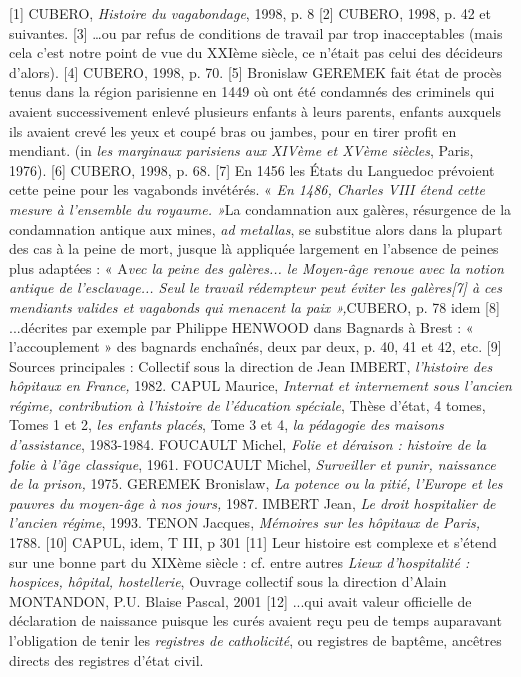 [1] CUBERO, \emph{Histoire du vagabondage}, 1998, p. 8
[2] CUBERO, 1998, p. 42 et suivantes.
[3] …ou par refus de conditions de travail par trop inacceptables (mais cela c'est notre point de vue du XXIème siècle, ce n'était pas celui des décideurs d'alors).
[4] CUBERO, 1998, p. 70.
[5] Bronislaw GEREMEK fait état de procès tenus dans la région parisienne en 1449 où ont été condamnés des criminels qui avaient successivement enlevé plusieurs enfants à leurs parents, enfants auxquels ils avaient crevé les yeux et coupé bras ou jambes, pour en tirer profit en mendiant. (in\emph{ les marginaux parisiens aux XIVème et XVème siècles}, Paris, 1976). 
[6] CUBERO, 1998, p. 68.
[7] En 1456 les États du Languedoc prévoient cette peine pour les vagabonds invétérés. « \emph{En 1486, Charles VIII étend cette mesure à l'ensemble du royaume. »}La condamnation aux galères, résurgence de la condamnation antique aux mines,\emph{ ad metallas}, se substitue alors dans la plupart des cas à la peine de mort, jusque là appliquée largement en l'absence de peines plus adaptées : « A\emph{vec la peine des galères... le Moyen-âge renoue avec la notion antique de l'esclavage... Seul le travail rédempteur peut éviter les galères[7] à ces mendiants valides et vagabonds qui menacent la paix »,}CUBERO, p. 78 idem
[8] ...décrites par exemple par Philippe HENWOOD dans Bagnards à Brest : « l'accouplement » des bagnards enchaînés, deux par deux, p. 40, 41 et 42, etc.
[9] Sources principales : Collectif sous la direction de Jean IMBERT, \emph{l'histoire des hôpitaux en France,} 1982. CAPUL Maurice, \emph{Internat et internement sous l'ancien régime, contribution à l'histoire de l'éducation spéciale}, Thèse d'état, 4 tomes, Tomes 1 et 2,\emph{ les enfants placés}, Tome 3 et 4, \emph{la pédagogie des maisons d'assistance}, 1983-1984. FOUCAULT Michel, \emph{Folie et déraison : histoire de la folie à l'âge classique}, 1961. FOUCAULT Michel, \emph{Surveiller et punir, naissance de la prison,} 1975. GEREMEK Bronislaw, \emph{La potence ou la pitié, l'Europe et les pauvres du moyen-âge à nos jours,} 1987. IMBERT Jean, \emph{Le droit hospitalier de l'ancien régime}, 1993. TENON Jacques, \emph{Mémoires sur les hôpitaux de Paris,} 1788.
[10] CAPUL, idem, T III, p 301
[11] Leur histoire est complexe et s'étend sur une bonne part du XIXème siècle : cf. entre autres \emph{Lieux d'hospitalité : hospices, hôpital, hostellerie}, Ouvrage collectif sous la direction d'Alain MONTANDON, P.U. Blaise Pascal, 2001
[12] ...qui avait valeur officielle de déclaration de naissance puisque les curés avaient reçu peu de temps auparavant l'obligation de tenir les \emph{registres de catholicité}, ou registres de baptême, ancêtres directs des registres d'état civil.
